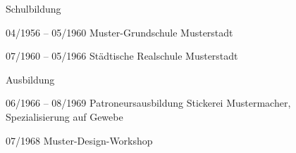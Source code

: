 \documentclass[german]{alpication}
\begin{document}
{	%


}{%

	\setlength{\cvlabelwidth}{32mm} %

	\begin{cvsection}{Schulbildung}
		\item [04/1956 -- 05/1960] 	Muster-Grundschule Musterstadt
		\item [07/1960 -- 05/1966] 	Städtische Realschule Musterstadt
	\end{cvsection}

	\begin{cvsection}{Ausbildung}
		\item [06/1966 -- 08/1969] 	Patroneursausbildung Stickerei Mustermacher,\\Spezialisierung auf Gewebe
		\item [07/1968]			Muster-Design-Workshop
	\end{cvsection}

} %


% 
% 
\end{document}
